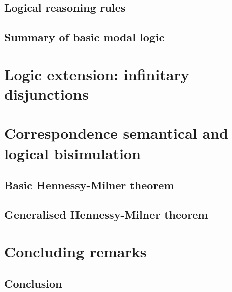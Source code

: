 \documentclass[10pt, letterpaper]{article}
\begin{document}
    \subsection{Logical reasoning rules}
    \label{sec:deductive_sys}
    
    \subsection{Summary of basic modal logic}
    

    \section{Logic extension: infinitary disjunctions}
    \label{sec:inf_disj}
    

    \section{Correspondence semantical and logical bisimulation}
    \label{sec:hm_theorems}
    
    \subsection{Basic Hennessy-Milner theorem}
    \label{sec:hm_basic}
    
    \subsection{Generalised Hennessy-Milner theorem}
    \label{sec:hm_general}
    

    \section{Concluding remarks}
    
    \subsection{Conclusion}
    \label{sec:conclusion}
    


    \printbibliography[heading=bibintoc,title={References}]
\end{document}
